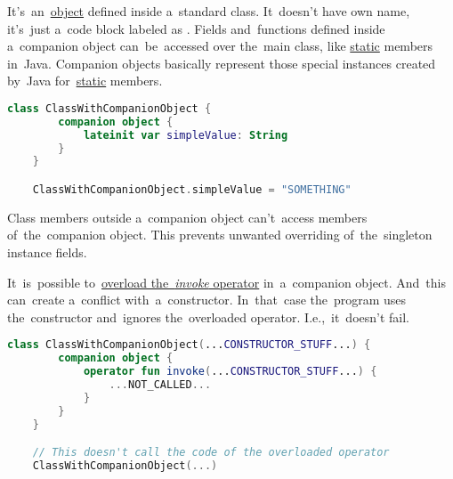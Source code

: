 \label{kotlincompanionobject}
It's~an~\hyperref[kotlinobject]{object} defined inside a~standard class.
It~doesn't have own name, it's~just a~code block labeled as .
Fields and~functions defined inside a~companion object can~be~accessed over the~main class, like \hyperref[javastatic]{static} members in~Java.
Companion objects basically represent those special instances created by~Java for~\hyperref[javastatic]{static} members.

\begin{lstlisting}[language=Kotlin]
    class ClassWithCompanionObject {
        companion object {
            lateinit var simpleValue: String
        }
    }

    ClassWithCompanionObject.simpleValue = "SOMETHING"
\end{lstlisting}

\note Class members outside a~companion object can't~access members of~the~companion object.
This prevents unwanted overriding of~the~singleton instance fields.
\newpage

It~is~possible to~\hyperref[kotlininvokeoverload]{overload \mbox{the \textit{invoke}} operator} in~a~companion object.
And~this can~create a~conflict with~a~constructor.
In~that~case the~program uses the~constructor and~ignores the~overloaded operator.
I.e.,~it~doesn't fail.

\begin{lstlisting}[language=Kotlin]
    class ClassWithCompanionObject(...CONSTRUCTOR_STUFF...) {
        companion object {
            operator fun invoke(...CONSTRUCTOR_STUFF...) {
                ...NOT_CALLED...
            }
        }
    }

    // This doesn't call the code of the overloaded operator
    ClassWithCompanionObject(...)
\end{lstlisting}
